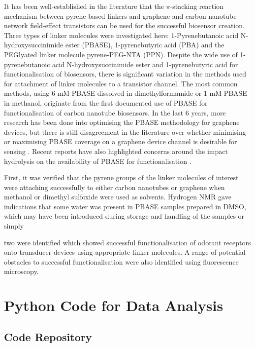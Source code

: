 \documentclass[
  a4paper,
]{scrbook}
\begin{document}
It has been well-established in the literature that the \(\pi\)-stacking
reaction mechanism between pyrene-based linkers and graphene and carbon
nanotube network field-effect transistors can be used for the successful
biosensor creation. Three types of linker molecules were investigated
here: 1-Pyrenebutanoic acid N-hydroxysuccinimide ester (PBASE),
1-pyrenebutyric acid (PBA) and the PEGlyated linker molecule
pyrene-PEG-NTA (PPN). Despite the wide use of 1-pyrenebutanoic acid
N-hydroxysuccinimide ester and 1-pyrenebutyric acid for
functionalisation of biosensors, there is significant variation in the
methods used for attachment of linker molecules to a transistor channel.
The most common methods, using 6 mM PBASE dissolved in dimethylformamide
or 1 mM PBASE in methanol, originate from the first documented use of
PBASE for functionalisation of carbon nanotube biosensors. In the last 6
years, more research has been done into optimising the PBASE methodology
for graphene devices, but there is still disagreement in the literature
over whether minimising or maximising PBASE coverage on a graphene
device channel is desirable for sensing
\autocite{Zhen2018,Hao2020,Wang2020,Mishyn2022}. Recent reports have
also highlighted concerns around the impact hydrolysis on the
availability of PBASE for functionalisation \autocite{Mishyn2022}.

First, it was verified that the pyrene groups of the linker molecules of
interest were attaching successfully to either carbon nanotubes or
graphene when methanol or dimethyl sulfoxide were used as solvents.
Hydrogen NMR gave indications that some water was present in PBASE
samples prepared in DMSO, which may have been introduced during storage
and handling of the samples or simply

two were identified which showed successful functionalisation of odorant
receptors onto transducer devices using appropriate linker molecules. A
range of potential obstacles to successful functionalisation were also
identified using fluorescence microscopy.

\cleardoublepage
{}
{}
\appendix

\hypertarget{sec-python}{%
\chapter{Python Code for Data Analysis}\label{sec-python}}

\hypertarget{code-repository}{%
\section{Code Repository}\label{code-repository}}
\end{document}
